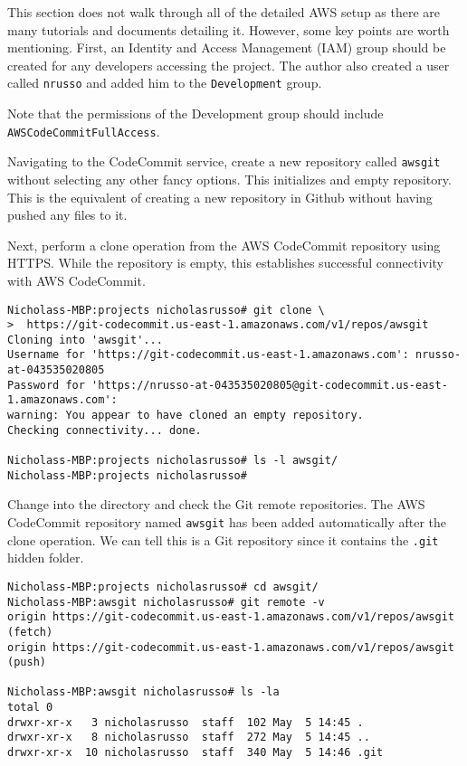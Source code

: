 This section does not walk through all of the detailed AWS setup as there are
many tutorials and documents detailing it. However, some key points are worth
mentioning. First, an Identity and Access Management (IAM) group should be
created for any developers accessing the project. The author also created a
user called \verb|nrusso| and added him to the \verb|Development| group.


Note that the permissions of the Development group should include
\verb|AWSCodeCommitFullAccess|.


Navigating to the CodeCommit service, create a new repository called
\verb|awsgit| without selecting any other fancy options. This initializes and
empty repository. This is the equivalent of creating a new repository in
Github without having pushed any files to it.


Next, perform a clone operation from the AWS CodeCommit repository using
HTTPS\@. While the repository is empty, this establishes successful connectivity
with AWS CodeCommit.

\begin{verbatim}
Nicholass-MBP:projects nicholasrusso# git clone \
>  https://git-codecommit.us-east-1.amazonaws.com/v1/repos/awsgit
Cloning into 'awsgit'...
Username for 'https://git-codecommit.us-east-1.amazonaws.com': nrusso-at-043535020805
Password for 'https://nrusso-at-043535020805@git-codecommit.us-east-1.amazonaws.com':
warning: You appear to have cloned an empty repository.
Checking connectivity... done.

Nicholass-MBP:projects nicholasrusso# ls -l awsgit/
Nicholass-MBP:projects nicholasrusso#
\end{verbatim}

Change into the directory and check the Git remote repositories. The AWS
CodeCommit repository named \verb|awsgit| has been added automatically after
the clone operation. We can tell this is a Git repository since it contains
the \verb|.git| hidden folder.

\begin{verbatim}
Nicholass-MBP:projects nicholasrusso# cd awsgit/
Nicholass-MBP:awsgit nicholasrusso# git remote -v
origin https://git-codecommit.us-east-1.amazonaws.com/v1/repos/awsgit (fetch)
origin https://git-codecommit.us-east-1.amazonaws.com/v1/repos/awsgit (push)

Nicholass-MBP:awsgit nicholasrusso# ls -la
total 0
drwxr-xr-x   3 nicholasrusso  staff  102 May  5 14:45 .
drwxr-xr-x   8 nicholasrusso  staff  272 May  5 14:45 ..
drwxr-xr-x  10 nicholasrusso  staff  340 May  5 14:46 .git
\end{verbatim}

